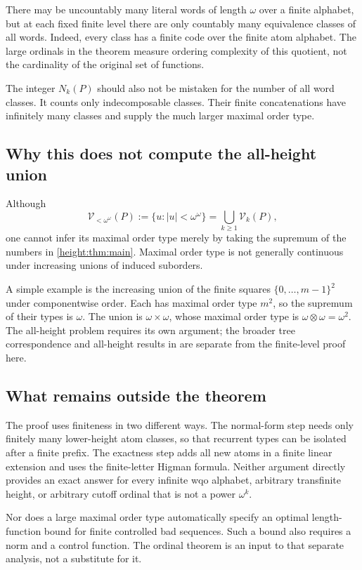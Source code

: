 \documentclass[11pt,a4paper]{article}
\numberwithin{equation}{section}
\theoremstyle{definition}
\theoremstyle{remark}
\newcommand{\Vheight}{\mathcal V}
\begin{document}
There may be uncountably many literal words of length $\omega$ over a
finite alphabet, but at each fixed finite level there are only countably
many equivalence classes of all words. Indeed, every class has a finite
code over the finite atom alphabet. The large ordinals in the theorem
measure ordering complexity of this quotient, not the cardinality of
the original set of functions.

The integer $N_k(P)$ should also not be mistaken for the number of all
word classes. It counts only indecomposable classes. Their finite
concatenations have infinitely many classes and supply the much larger
maximal order type.

\subsection{Why this does not compute the all-height union}

Although
\[
  \Vheight_{<\omega^\omega}(P):=\{u:|u|<\omega^\omega\}
  =\bigcup_{k\ge1}\Vheight_k(P),
\]
one cannot infer its maximal order type merely by taking the supremum
of the numbers in \cref{height:thm:main}. Maximal order type is not generally
continuous under increasing unions of induced suborders.

A simple example is the increasing union of the finite squares
$\{0,\ldots,m-1\}^2$ under componentwise order. Each has maximal order
type $m^2$, so the supremum of their types is $\omega$. The union is
$\omega\times\omega$, whose maximal order type is
$\omega\otimes\omega=\omega^2$. The all-height problem requires its own
argument; the broader tree correspondence and all-height results in
\cite{ChopraPakhomov2026} are separate from the finite-level proof here.

\subsection{What remains outside the theorem}

The proof uses finiteness in two different ways. The normal-form step
needs only finitely many lower-height atom classes, so that recurrent
types can be isolated after a finite prefix. The exactness step adds all
new atoms in a finite linear extension and uses the finite-letter Higman
formula. Neither argument directly provides an exact answer for every
infinite wqo alphabet, arbitrary transfinite height, or arbitrary cutoff
ordinal that is not a power $\omega^k$.

Nor does a large maximal order type automatically specify an optimal
length-function bound for finite controlled bad sequences. Such a bound
also requires a norm and a control function. The ordinal theorem is an
input to that separate analysis, not a substitute for it.
\end{document}

